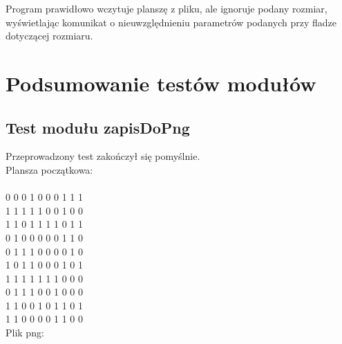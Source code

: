 \documentclass[10pt, oneside]{article}
\begin{document}
Program prawidłowo wczytuje planszę z pliku, ale ignoruje podany rozmiar, wyświetlając komunikat o nieuwzględnieniu parametrów podanych przy fladze dotyczącej rozmiaru. 







\section{Podsumowanie testów modułów}
\subsection{Test modułu zapisDoPng}
Przeprowadzony test zakończył się pomyślnie. \\
Plansza początkowa:\\
\\
0 0 0 1 0 0 0 1 1 1 \\
1 1 1 1 1 0 0 1 0 0 \\
1 1 0 1 1 1 1 0 1 1 \\
0 1 0 0 0 0 0 1 1 0 \\
0 1 1 1 0 0 0 0 1 0 \\
1 0 1 1 0 0 0 1 0 1 \\
1 1 1 1 1 1 1 0 0 0 \\
0 1 1 1 0 0 1 0 0 0 \\
1 1 0 0 1 0 1 1 0 1 \\
1 1 0 0 0 0 1 1 0 0 \\


Plik png:
 
\end{document}

